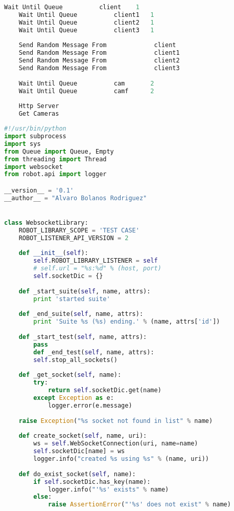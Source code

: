 \documentclass[hidelinks,11pt,a4paper,oneside,article]{memoir}
\begin{document}
\begin{lstlisting}[label={listing:robottest},caption={RobotFramework test file},language=Python, style=styleprogramming]
    Wait Until Queue          client    1
    Wait Until Queue          client1   1
    Wait Until Queue          client2   1
    Wait Until Queue          client3   1
    
    Send Random Message From             client
    Send Random Message From             client1
    Send Random Message From             client2
    Send Random Message From             client3
    
    Wait Until Queue          cam       2
    Wait Until Queue          camf      2
    
    Http Server
    Get Cameras
\end{lstlisting}

\begin{lstlisting}[label={listing:robotlib},caption={RobotFramework websocket library},language=Python, style=styleprogramming]
#!/usr/bin/python
import subprocess
import sys
from Queue import Queue, Empty
from threading import Thread
import websocket
from robot.api import logger

__version__ = '0.1'
__author__ = "Alvaro Bolanos Rodriguez"


class WebsocketLibrary:
    ROBOT_LIBRARY_SCOPE = 'TEST CASE'
    ROBOT_LISTENER_API_VERSION = 2
    
    def __init__(self):
        self.ROBOT_LIBRARY_LISTENER = self
        # self.url = "%s:%d" % (host, port)
        self.socketDic = {}
    
    def _start_suite(self, name, attrs):
        print 'started suite'
    
    def _end_suite(self, name, attrs):
        print 'Suite %s (%s) ending.' % (name, attrs['id'])
    
    def _start_test(self, name, attrs):
        pass
        def _end_test(self, name, attrs):
        self.stop_all_sockets()
    
    def _get_socket(self, name):
        try:
            return self.socketDic.get(name)
        except Exception as e:
            logger.error(e.message)
    
    raise Exception("%s socket not found in list" % name)
    
    def create_socket(self, name, uri):
        ws = self.WebSocketConnection(uri, name=name)
        self.socketDic[name] = ws
        logger.info("created %s using %s" % (name, uri))
    
    def do_exist_socket(self, name):
        if self.socketDic.has_key(name):
            logger.info("'%s' exists" % name)
        else:
            raise AssertionError("'%s' does not exist" % name)
    

\end{lstlisting}
\end{document}
